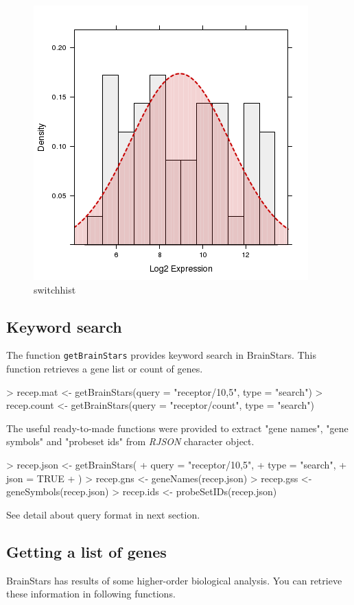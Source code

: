 \documentclass[12pt,fullpage]{article}
\newcommand{\Rfunction}[1]{{\texttt{#1}}}
\newcommand{\Rpackage}[1]{{\textit{#1}}}
\begin{document}
\begin{figure}
  \centering
  \includegraphics{switchhist.png}
  \caption{switchhist}
\end{figure}

\subsection{Keyword search}
The function \Rfunction{getBrainStars} provides keyword search in BrainStars. This function retrieves a gene list or count of genes.
\begin{Schunk}
\begin{Sinput}
> recep.mat   <- getBrainStars(query = "receptor/10,5",  type = "search")
> recep.count <- getBrainStars(query = "receptor/count", type = "search")
\end{Sinput}
\end{Schunk}
The useful ready-to-made functions were provided to extract "gene names", "gene symbols" and "probeset ids" from \Rpackage{RJSON} character object.
\begin{Schunk}
\begin{Sinput}
> recep.json <- getBrainStars(
+   query  = "receptor/10,5",
+   type   = "search",
+   json   = TRUE
+ )
> recep.gns  <- geneNames(recep.json)
> recep.gss  <- geneSymbols(recep.json)
> recep.ids  <- probeSetIDs(recep.json)
\end{Sinput}
\end{Schunk}
See detail about query format in next section.

\subsection{Getting a list of genes}
BrainStars has results of some higher-order biological analysis. You can retrieve these information in following functions.
\end{document}
